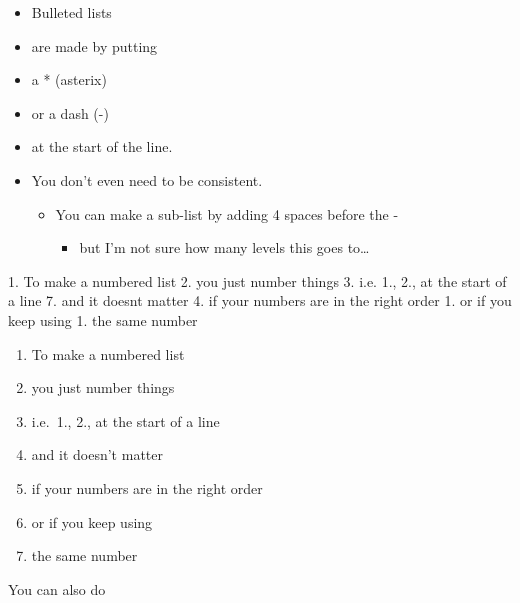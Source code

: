 \documentclass[
]{book}
\newenvironment{Shaded}{\begin{snugshade}}{\end{snugshade}}
\newcommand{\NormalTok}[1]{#1}
\newcommand{\SpecialStringTok}[1]{\textcolor[rgb]{0.31,0.60,0.02}{#1}}
\providecommand{\tightlist}{%
  \setlength{\itemsep}{0pt}\setlength{\parskip}{0pt}}
\begin{document}
\begin{itemize}
\tightlist
\item
  Bulleted lists
\item
  are made by putting
\item
  a * (asterix)
\item
  or a dash (-)
\item
  at the start of the line.
\item
  You don't even need to be consistent.

  \begin{itemize}
  \tightlist
  \item
    You can make a sub-list by adding 4 spaces before the -

    \begin{itemize}
    \tightlist
    \item
      but I'm not sure how many levels this goes to\ldots{}
    \end{itemize}
  \end{itemize}
\end{itemize}

\begin{Shaded}
\begin{Highlighting}[]
\SpecialStringTok{1. }\NormalTok{To make a numbered list}
\SpecialStringTok{2. }\NormalTok{you just number things}
\SpecialStringTok{3. }\NormalTok{i.e. 1., 2., at the start of a line}
\SpecialStringTok{7. }\NormalTok{and it doesn\textquotesingle{}t matter}
\SpecialStringTok{4. }\NormalTok{if your numbers are in the right order}
\SpecialStringTok{1. }\NormalTok{or if you keep using}
\SpecialStringTok{1. }\NormalTok{the same number}
\end{Highlighting}
\end{Shaded}

\begin{enumerate}
\def\labelenumi{\arabic{enumi}.}
\tightlist
\item
  To make a numbered list
\item
  you just number things
\item
  i.e.~1., 2., at the start of a line
\item
  and it doesn't matter
\item
  if your numbers are in the right order
\item
  or if you keep using
\item
  the same number
\end{enumerate}

You can also do
\end{document}
